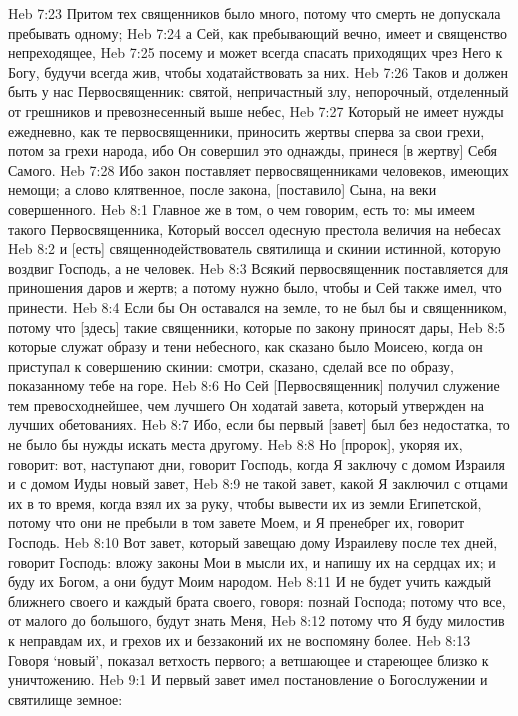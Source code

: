Heb 7:23  Притом тех священников было много, потому что смерть не допускала пребывать одному;
Heb 7:24  а Сей, как пребывающий вечно, имеет и священство непреходящее,
Heb 7:25  посему и может всегда спасать приходящих чрез Него к Богу, будучи всегда жив, чтобы ходатайствовать за них.
Heb 7:26  Таков и должен быть у нас Первосвященник: святой, непричастный злу, непорочный, отделенный от грешников и превознесенный выше небес,
Heb 7:27  Который не имеет нужды ежедневно, как те первосвященники, приносить жертвы сперва за свои грехи, потом за грехи народа, ибо Он совершил это однажды, принеся [в жертву] Себя Самого.
Heb 7:28  Ибо закон поставляет первосвященниками человеков, имеющих немощи; а слово клятвенное, после закона, [поставило] Сына, на веки совершенного.
Heb 8:1  Главное же в том, о чем говорим, есть то: мы имеем такого Первосвященника, Который воссел одесную престола величия на небесах
Heb 8:2  и [есть] священнодействователь святилища и скинии истинной, которую воздвиг Господь, а не человек.
Heb 8:3  Всякий первосвященник поставляется для приношения даров и жертв; а потому нужно было, чтобы и Сей также имел, что принести.
Heb 8:4  Если бы Он оставался на земле, то не был бы и священником, потому что [здесь] такие священники, которые по закону приносят дары,
Heb 8:5  которые служат образу и тени небесного, как сказано было Моисею, когда он приступал к совершению скинии: смотри, сказано, сделай все по образу, показанному тебе на горе.
Heb 8:6  Но Сей [Первосвященник] получил служение тем превосходнейшее, чем лучшего Он ходатай завета, который утвержден на лучших обетованиях.
Heb 8:7  Ибо, если бы первый [завет] был без недостатка, то не было бы нужды искать места другому.
Heb 8:8  Но [пророк], укоряя их, говорит: вот, наступают дни, говорит Господь, когда Я заключу с домом Израиля и с домом Иуды новый завет,
Heb 8:9  не такой завет, какой Я заключил с отцами их в то время, когда взял их за руку, чтобы вывести их из земли Египетской, потому что они не пребыли в том завете Моем, и Я пренебрег их, говорит Господь.
Heb 8:10  Вот завет, который завещаю дому Израилеву после тех дней, говорит Господь: вложу законы Мои в мысли их, и напишу их на сердцах их; и буду их Богом, а они будут Моим народом.
Heb 8:11  И не будет учить каждый ближнего своего и каждый брата своего, говоря: познай Господа; потому что все, от малого до большого, будут знать Меня,
Heb 8:12  потому что Я буду милостив к неправдам их, и грехов их и беззаконий их не воспомяну более.
Heb 8:13  Говоря `новый', показал ветхость первого; а ветшающее и стареющее близко к уничтожению.
Heb 9:1  И первый завет имел постановление о Богослужении и святилище земное:
